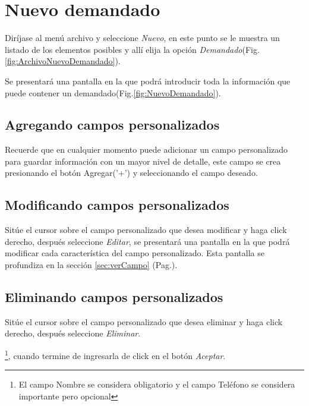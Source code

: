 \section{Nuevo demandado}
\label{sec:nuevoDemandado}
Dir\'ijase al men\'u archivo y seleccione \emph{Nuevo}, en este punto se le muestra un listado de los elementos posibles y
all\'i elija la opci\'on \emph{Demandado}(Fig.\ref{fig:ArchivoNuevoDemandado}). 
  

Se presentar\'a una pantalla en la que podr\'a introducir toda la informaci\'on
que puede contener un demandado(Fig.\ref{fig:NuevoDemandado}). 
  

\subsection{Agregando campos personalizados}
\label{sec:agregarCamposDemandado}
Recuerde que en cualquier momento puede adicionar un campo personalizado para guardar informaci\'on con un mayor nivel de detalle, este campo se crea presionando el bot\'on Agregar('+') y seleccionando el campo deseado.

\subsection{Modificando campos personalizados}
\label{sec:modificarCamposDemandado}
Sit\'ue el cursor sobre el campo personalizado que desea modificar y haga click derecho, despu\'es seleccione \emph{Editar},
se presentar\'a una pantalla en la que podr\'a modificar cada caracter\'istica
del campo personalizado. Esta pantalla se profundiza en la secci\'on
\ref{sec:verCampo} (Pag.\pageref{sec:verCampo}).

\subsection{Eliminando campos personalizados}
\label{sec:eliminarCamposDemandado}
Sit\'ue el cursor sobre el campo personalizado que desea eliminar y haga click derecho, despu\'es seleccione \emph{Eliminar}.

\footnote{El campo Nombre se considera obligatorio y el campo Tel\'efono se
considera importante pero opcional},
cuando termine de ingresarla de click en el bot\'on \emph{Aceptar}.